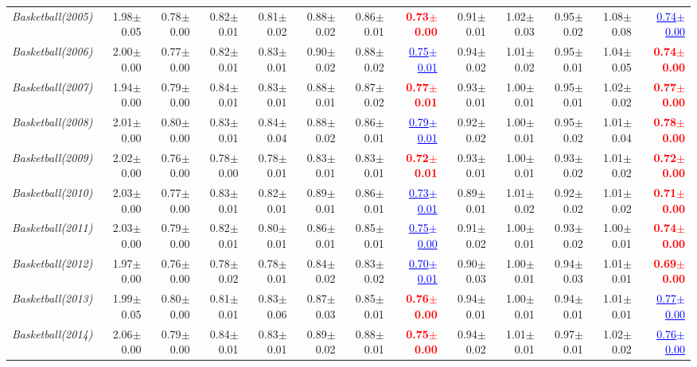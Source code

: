 \documentclass[nohyperref]{article}
\theoremstyle{plain}
\theoremstyle{definition}
\theoremstyle{remark}
\newcommand{\red}[1]{\textcolor{red}{\textbf{#1}}}
\newcommand{\blue}[1]{\textcolor{blue}{\underline{#1}}}
\begin{document}
\begin{table*}[!ht]
{\begin{tabular}{lrr|rrrrr|rrrrr}
			{\it Basketball(2005)} & 1.98$\pm$0.05 & 0.78$\pm$0.00 & 0.82$\pm$0.01 & 0.81$\pm$0.02 & 0.88$\pm$0.02 & 0.86$\pm$0.01 & \red{0.73$\pm$0.00} & 0.91$\pm$0.01 & 1.02$\pm$0.03 & 0.95$\pm$0.02 & 1.08$\pm$0.08 & \blue{0.74$\pm$0.00} \\
			{\it Basketball(2006)} & 2.00$\pm$0.00 & 0.77$\pm$0.00 & 0.82$\pm$0.01 & 0.83$\pm$0.01 & 0.90$\pm$0.02 & 0.88$\pm$0.02 & \blue{0.75$\pm$0.01} & 0.94$\pm$0.02 & 1.01$\pm$0.02 & 0.95$\pm$0.01 & 1.04$\pm$0.05 & \red{0.74$\pm$0.00} \\
			{\it Basketball(2007)} & 1.94$\pm$0.00 & 0.79$\pm$0.00 & 0.84$\pm$0.01 & 0.83$\pm$0.01 & 0.88$\pm$0.01 & 0.87$\pm$0.02 & \red{0.77$\pm$0.01} & 0.93$\pm$0.01 & 1.00$\pm$0.01 & 0.95$\pm$0.01 & 1.02$\pm$0.02 & \red{0.77$\pm$0.00} \\
			{\it Basketball(2008)} & 2.01$\pm$0.00 & 0.80$\pm$0.00 & 0.83$\pm$0.01 & 0.84$\pm$0.04 & 0.88$\pm$0.02 & 0.86$\pm$0.01 & \blue{0.79$\pm$0.01} & 0.92$\pm$0.02 & 1.00$\pm$0.01 & 0.95$\pm$0.02 & 1.01$\pm$0.04 & \red{0.78$\pm$0.00} \\
			{\it Basketball(2009)} & 2.02$\pm$0.00 & 0.76$\pm$0.00 & 0.78$\pm$0.00 & 0.78$\pm$0.01 & 0.83$\pm$0.01 & 0.83$\pm$0.01 & \red{0.72$\pm$0.01} & 0.93$\pm$0.01 & 1.00$\pm$0.01 & 0.93$\pm$0.02 & 1.01$\pm$0.02 & \red{0.72$\pm$0.00} \\
			{\it Basketball(2010)} & 2.03$\pm$0.00 & 0.77$\pm$0.00 & 0.83$\pm$0.01 & 0.82$\pm$0.01 & 0.89$\pm$0.01 & 0.86$\pm$0.01 & \blue{0.73$\pm$0.01} & 0.89$\pm$0.01 & 1.01$\pm$0.02 & 0.92$\pm$0.02 & 1.01$\pm$0.02 & \red{0.71$\pm$0.00} \\
			{\it Basketball(2011)} & 2.03$\pm$0.00 & 0.79$\pm$0.00 & 0.82$\pm$0.01 & 0.80$\pm$0.01 & 0.86$\pm$0.01 & 0.85$\pm$0.01 & \blue{0.75$\pm$0.00} & 0.91$\pm$0.02 & 1.00$\pm$0.01 & 0.93$\pm$0.02 & 1.00$\pm$0.01 & \red{0.74$\pm$0.00} \\
			{\it Basketball(2012)} & 1.97$\pm$0.00 & 0.76$\pm$0.00 & 0.78$\pm$0.02 & 0.78$\pm$0.01 & 0.84$\pm$0.02 & 0.83$\pm$0.02 & \blue{0.70$\pm$0.01} & 0.90$\pm$0.03 & 1.00$\pm$0.01 & 0.94$\pm$0.03 & 1.01$\pm$0.01 & \red{0.69$\pm$0.00} \\
			{\it Basketball(2013)} & 1.99$\pm$0.05 & 0.80$\pm$0.00 & 0.81$\pm$0.01 & 0.83$\pm$0.06 & 0.87$\pm$0.03 & 0.85$\pm$0.01 & \red{0.76$\pm$0.00} & 0.94$\pm$0.01 & 1.00$\pm$0.01 & 0.94$\pm$0.01 & 1.01$\pm$0.01 & \blue{0.77$\pm$0.00} \\
			{\it Basketball(2014)} & 2.06$\pm$0.00 & 0.79$\pm$0.00 & 0.84$\pm$0.01 & 0.83$\pm$0.01 & 0.89$\pm$0.02 & 0.88$\pm$0.01 & \red{0.75$\pm$0.00} & 0.94$\pm$0.02 & 1.01$\pm$0.01 & 0.97$\pm$0.01 & 1.02$\pm$0.02 & \blue{0.76$\pm$0.00} \\

\end{tabular}}
\end{table*}
\end{document}
